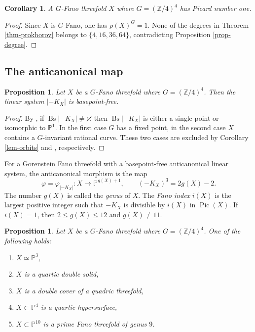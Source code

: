 \documentclass[10pt,oneside,reqno]{amsart}
\numberwithin{equation}{section}
\newtheorem{proposition}[theorem]{Proposition}
\newtheorem{corollary}[theorem]{Corollary}
\theoremstyle{definition}
\newcommand{\PP}{\mathbb P}
\newcommand{\Pic}{\operatorname{Pic}}
\newcommand{\Bs}{\operatorname{Bs}}
\begin{document}
\begin{corollary}
\label{cor-rho-one}
A $G$-Fano threefold $X$ where $G=(\mathbb{Z}/4)^4$ has Picard number one.
\end{corollary}

\begin{proof}
Since $X$ is $G$-Fano, one has $\rho(X)^G=1$.  None of the degrees
in Theorem \ref{thm-prokhorov} belongs to
$\{4,16,36,64\}$, contradicting Proposition \ref{prop-degree}.
\end{proof}

\subsection{The anticanonical map}

\begin{proposition}
\label{prop-anticanonical-free}
Let $X$ be a $G$-Fano threefold where $G=(\mathbb{Z}/4)^4$. 
Then the linear system $|-K_X|$ is basepoint-free.
\end{proposition}

\begin{proof}
By
\cite[Proposition~2.4.1, Remark 2.4.2]{IP}, if 
$\Bs|-K_X|\neq\varnothing$ then $\Bs|-K_X|$ is either a single
point or isomorphic to $\PP^1$.  In the first case $G$ has a fixed
point, in the second case $X$ contains a $G$-invariant rational curve.
These two cases are excluded by Corollary \ref{lem-orbits} and
\cite[Corollary~3.14]{LoginovProduct}, respectively.
\end{proof}

For a Gorenstein Fano threefold with a basepoint-free anticanonical
linear system, the anticanonical morphism is the map
\[
 \varphi=\varphi_{|-K_X|}\colon X\longrightarrow\PP^{g(X)+1},
 \qquad (-K_X)^3=2g(X)-2.
\]
The number $g(X)$ is called the \emph{genus} of $X$.  The \emph{Fano
index} $i(X)$ is the largest positive integer such that $-K_X$ is
divisible by $i(X)$ in $\Pic(X)$.  If $i(X)=1$, then
$2\leq g(X)\leq12$ and $g(X)\neq11$.

\begin{proposition}
\label{prop-gorenstein-list}
Let $X$ be a $G$-Fano threefold where $G=(\mathbb{Z}/4)^4$. 
One of the following holds:
\begin{enumerate}
\item $X\simeq\PP^3$,
\item $X$ is a quartic double solid,
\item $X$ is a double cover of a quadric threefold,
\item $X\subset\PP^4$ is a quartic hypersurface,
\item $X\subset\PP^{10}$ is a prime Fano threefold of genus $9$.
\end{enumerate}
\end{proposition}
\end{document}
